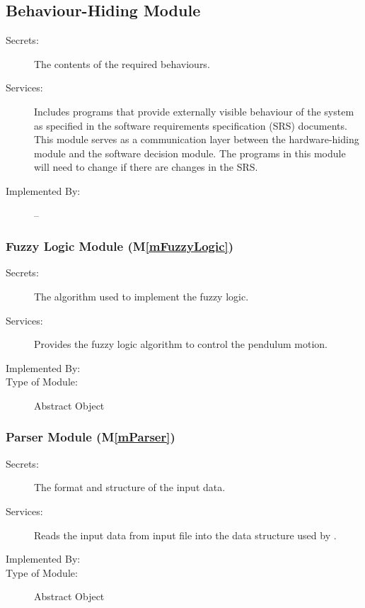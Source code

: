 \documentclass[12pt, titlepage]{article}
\newcommand{\mref}[1]{M\ref{#1}}
\begin{document}
\subsection{Behaviour-Hiding Module}

\begin{description}
\item[Secrets:]The contents of the required behaviours.
\item[Services:]Includes programs that provide externally visible behaviour of
  the system as specified in the software requirements specification (SRS)
  documents. This module serves as a communication layer between the
  hardware-hiding module and the software decision module. The programs in this
  module will need to change if there are changes in the SRS.
\item[Implemented By:] --
\end{description}

\subsubsection{Fuzzy Logic Module (\mref{mFuzzyLogic})}

\begin{description}
\item[Secrets:] The algorithm used to implement the fuzzy logic.
\item[Services:] Provides the fuzzy logic algorithm to control the pendulum motion.
\item[Implemented By:] \progname{}
\item[Type of Module:] Abstract Object
\end{description}

\subsubsection{Parser Module (\mref{mParser})}

\begin{description}
\item[Secrets:] The format and structure of the input data.
\item[Services:] Reads the input data from input file into 
                 the data structure used by \progname{}.
\item[Implemented By:] \progname{}
\item[Type of Module:] Abstract Object
\end{description}
\end{document}

